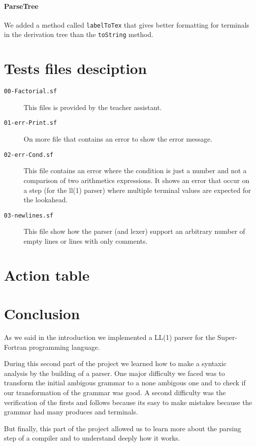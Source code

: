 \documentclass[12pt]{article}
\begin{document}
\paragraph{ParseTree}
We added a method called \texttt{labelToTex} that gives better formatting for terminals in the 
derivation tree than the \texttt{toString} method.


\section{Tests files desciption}

\begin{description}
    \item[\texttt{00-Factorial.sf}] This files is provided by the teacher assistant.
    \item[\texttt{01-err-Print.sf}] On more file that contains an error
    to show the error message.
    \item[\texttt{02-err-Cond.sf}] 
        This file contains an error where the condition is
        just a number and not a comparison of two arithmetics expressions.
        It shows an error that occur on a step (for the ll(1) parser)
        where multiple terminal values are expected for the lookahead.
    \item[\texttt{03-newlines.sf}] This file show how the parser
        (and lexer) support an arbitrary number of empty lines or lines with only comments. 
\end{description}

\section{Action table}


\section{Conclusion}

As we said in the introduction we implemented a LL(1) parser for the Super-Fortran programming language.

During this second part of the project we learned how to make a syntaxic analysis by
the building of a parser.
One major difficulty we faced was to transform the initial ambigous grammar to a none ambigous one
and to check if our transformation of the grammar was good.
A second difficulty was the verification of the firsts and follows because its easy to make mistakes
because the grammar had many produces and terminals.

But finally, this part of the project allowed us to learn more about the parsing step of a compiler 
and to understand deeply how it works.
\end{document}
